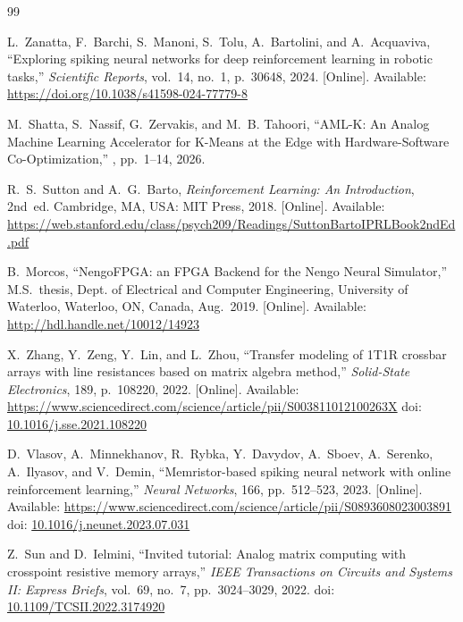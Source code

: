 \documentclass[letter, 12pt]{article}
\begin{document}
\begin{thebibliography}{99}

L.~Zanatta, F.~Barchi, S.~Manoni, S.~Tolu, A.~Bartolini, and A.~Acquaviva,
``Exploring spiking neural networks for deep reinforcement learning in robotic tasks,''
\emph{Scientific Reports}, vol.~14, no.~1, p.~30648, 2024.
[Online]. Available: \url{https://doi.org/10.1038/s41598-024-77779-8}

M.~Shatta, S.~Nassif, G.~Zervakis, and M.~B. Tahoori,
\newblock ``AML-K: An Analog Machine Learning Accelerator for K-Means at the Edge with Hardware-Software Co-Optimization,''
, pp.~1--14, 2026.

R.~S.~Sutton and A.~G.~Barto,
\emph{Reinforcement Learning: An Introduction},
2nd~ed.
Cambridge, MA, USA: MIT Press, 2018.
[Online]. Available: \url{https://web.stanford.edu/class/psych209/Readings/SuttonBartoIPRLBook2ndEd.pdf}


B.~Morcos,
``NengoFPGA: an FPGA Backend for the Nengo Neural Simulator,''
M.S.~thesis, Dept. of Electrical and Computer Engineering, University of Waterloo, Waterloo, ON, Canada, Aug.~2019. [Online]. Available: \url{http://hdl.handle.net/10012/14923}


X.~Zhang, Y.~Zeng, Y.~Lin, and L.~Zhou,
``Transfer modeling of 1T1R crossbar arrays with line resistances based on matrix algebra method,''
\emph{Solid-State Electronics}, 189, p.~108220, 2022.
[Online]. Available: \url{https://www.sciencedirect.com/science/article/pii/S003811012100263X}
doi: \href{https://doi.org/10.1016/j.sse.2021.108220}{10.1016/j.sse.2021.108220}

D.~Vlasov, A.~Minnekhanov, R.~Rybka, Y.~Davydov, A.~Sboev, A.~Serenko, A.~Ilyasov, and V.~Demin,
``Memristor-based spiking neural network with online reinforcement learning,''
\emph{Neural Networks}, 166, pp.~512--523, 2023.
[Online]. Available: \url{https://www.sciencedirect.com/science/article/pii/S0893608023003891}
doi: \href{https://doi.org/10.1016/j.neunet.2023.07.031}{10.1016/j.neunet.2023.07.031}

Z.~Sun and D.~Ielmini,
``Invited tutorial: Analog matrix computing with crosspoint resistive memory arrays,''
\emph{IEEE Transactions on Circuits and Systems II: Express Briefs}, vol.~69, no.~7, pp.~3024--3029, 2022.
doi: \href{https://doi.org/10.1109/TCSII.2022.3174920}{10.1109/TCSII.2022.3174920}


\end{thebibliography}
\end{document}
